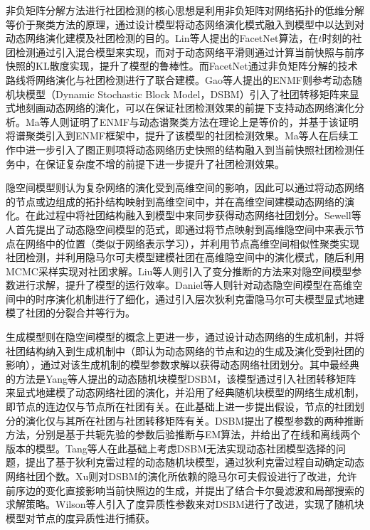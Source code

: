 非负矩阵分解方法进行社团检测的核心思想是利用非负矩阵对网络拓扑的低维分解等价于聚类方法的原理，通过设计模型将动态网络演化模式融入到模型中以达到对动态网络演化建模及社团检测的目的\cite{KXTS202104002}。Lin等人\cite{lin2009analyzing}提出的FacetNet算法，在$t$时刻的社团检测通过引入混合模型来实现，而对于动态网络平滑则通过计算当前快照与前序快照的KL散度实现，提升了模型的鲁棒性。而FacetNet通过非负矩阵分解的技术路线将网络演化与社团检测进行了联合建模。Gao等人\cite{gao2017dynamic}提出的ENMF则参考动态随机块模型（Dynamic Stochastic Block Model，DSBM）\cite{yang2011detecting}引入了社团转移矩阵来显式地刻画动态网络的演化，可以在保证社团检测效果的前提下支持动态网络演化分析。Ma等人\cite{ma2017evolutionary}则证明了ENMF与动态谱聚类方法在理论上是等价的，并基于该证明将谱聚类引入到ENMF框架中，提升了该模型的社团检测效果。Ma等人\cite{ma2019detecting}在后续工作中进一步引入了图正则项将动态网络历史快照的结构融入到当前快照社团检测任务中，在保证复杂度不增的前提下进一步提升了社团检测效果。

隐空间模型则认为复杂网络的演化受到高维空间的影响，因此可以通过将动态网络的节点或边组成的拓扑结构映射到高维空间中，并在高维空间建模动态网络的演化。在此过程中将社团结构融入到模型中来同步获得动态网络社团划分。Sewell等人\cite{sewell2015latent}首先提出了动态隐空间模型的范式，即通过将节点映射到高维隐空间中来表示节点在网络中的位置（类似于网络表示学习），并利用节点高维空间相似性聚类实现社团检测，并利用隐马尔可夫模型建模社团在高维隐空间中的演化模式，随后利用MCMC采样实现对社团求解。Liu等人\cite{liu2022variational}则引入了变分推断的方法来对隐空间模型参数进行求解，提升了模型的运行效率。Daniel等人\cite{daniel2023bayesian}则针对动态隐空间模型在高维空间中的时序演化机制进行了细化，通过引入层次狄利克雷隐马尔可夫模型显式地建模了社团的分裂合并等行为。

生成模型则在隐空间模型的概念上更进一步，通过设计动态网络的生成机制，并将社团结构纳入到生成机制中（即认为动态网络的节点和边的生成及演化受到社团的影响），通过对该生成机制的模型参数求解以获得动态网络社团划分。其中最经典的方法是Yang等人\cite{yang2011detecting}提出的动态随机块模型DSBM，该模型通过引入社团转移矩阵来显式地建模了动态网络社团的演化，并沿用了经典随机块模型的网络生成机制，即节点的连边仅与节点所在社团有关。在此基础上进一步提出假设，节点的社团划分的演化仅与其所在社团与社团转移矩阵有关。DSBM提出了模型参数的两种推断方法，分别是基于共轭先验的参数后验推断与EM算法，并给出了在线和离线两个版本的模型。Tang等人\cite{tang2014detecting}在此基础上考虑DSBM无法实现动态社团模型选择的问题，提出了基于狄利克雷过程的动态随机块模型，通过狄利克雷过程自动确定动态网络社团个数。Xu\cite{xu2015stochastic}则对DSBM的演化所依赖的隐马尔可夫假设进行了改进，允许前序边的变化直接影响当前快照边的生成，并提出了结合卡尔曼滤波和局部搜索的求解策略。Wilson等人\cite{wilson2019modeling}引入了度异质性参数来对DSBM进行了改进，实现了随机块模型对节点的度异质性进行捕获。

